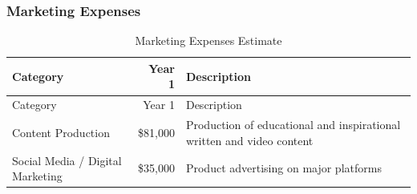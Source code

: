 \documentclass[11pt,openany]{book}
\begin{document}
\newpage{}

\hypertarget{marketing-expenses}{%
\subsubsection{Marketing Expenses}\label{marketing-expenses}}

\begin{longtable}[]{@{}lrl@{}}
\caption{Marketing Expenses Estimate}\tabularnewline
\toprule
\begin{minipage}[b]{0.32\columnwidth}\raggedright
Category\strut
\end{minipage} & \begin{minipage}[b]{0.11\columnwidth}\raggedleft
Year 1\strut
\end{minipage} & \begin{minipage}[b]{0.48\columnwidth}\raggedright
Description\strut
\end{minipage}\tabularnewline
\midrule
\endfirsthead
\toprule
\begin{minipage}[b]{0.32\columnwidth}\raggedright
Category\strut
\end{minipage} & \begin{minipage}[b]{0.11\columnwidth}\raggedleft
Year 1\strut
\end{minipage} & \begin{minipage}[b]{0.48\columnwidth}\raggedright
Description\strut
\end{minipage}\tabularnewline
\midrule
\endhead
\begin{minipage}[t]{0.32\columnwidth}\raggedright
Content Production\strut
\end{minipage} & \begin{minipage}[t]{0.11\columnwidth}\raggedleft
\$81,000\strut
\end{minipage} & \begin{minipage}[t]{0.48\columnwidth}\raggedright
Production of educational and inspirational written and video
content\strut
\end{minipage}\tabularnewline
\begin{minipage}[t]{0.32\columnwidth}\raggedright
Social Media / Digital Marketing\strut
\end{minipage} & \begin{minipage}[t]{0.11\columnwidth}\raggedleft
\$35,000\strut
\end{minipage} & \begin{minipage}[t]{0.48\columnwidth}\raggedright
Product advertising on major platforms\strut
\end{minipage}\tabularnewline

\end{longtable}
\end{document}
